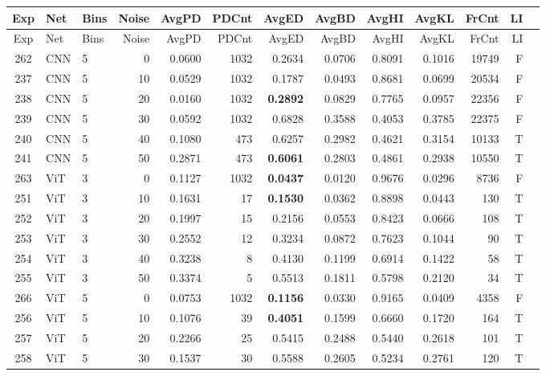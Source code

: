 
\begin{longtable}{@{}cllrrrrrrrrrc@{}}
\toprule
Exp & Net & Bins & Noise & AvgPD & PDCnt & AvgED & AvgBD & AvgHI & AvgKL & FrCnt & LI \\
\midrule
\endfirsthead
\toprule
Exp & Net & Bins & Noise & AvgPD & PDCnt & AvgED & AvgBD & AvgHI & AvgKL & FrCnt & LI \\
\midrule
\endhead
262 & CNN & 5 & 0 & 0.0600 & 1032 & 0.2634 & 0.0706 & 0.8091 & 0.1016 & 19749 & F \\
237 & CNN & 5 & 10 & 0.0529 & 1032 & 0.1787 & 0.0493 & 0.8681 & 0.0699 & 20534 & F \\
238 & CNN & 5 & 20 & 0.0160 & 1032 & \textbf{0.2892} & 0.0829 & 0.7765 & 0.0957 & 22356 & F \\
239 & CNN & 5 & 30 & 0.0592 & 1032 & 0.6828 & 0.3588 & 0.4053 & 0.3785 & 22375 & F \\
240 & CNN & 5 & 40 & 0.1080 & 473 & 0.6257 & 0.2982 & 0.4621 & 0.3154 & 10133 & T \\
241 & CNN & 5 & 50 & 0.2871 & 473 & \textbf{0.6061} & 0.2803 & 0.4861 & 0.2938 & 10550 & T \\
263 & ViT & 3 & 0 & 0.1127 & 1032 & \textbf{0.0437} & 0.0120 & 0.9676 & 0.0296 & 8736 & F \\
251 & ViT & 3 & 10 & 0.1631 & 17 & \textbf{0.1530} & 0.0362 & 0.8898 & 0.0443 & 130 & T \\
252 & ViT & 3 & 20 & 0.1997 & 15 & 0.2156 & 0.0553 & 0.8423 & 0.0666 & 108 & T \\
253 & ViT & 3 & 30 & 0.2552 & 12 & 0.3234 & 0.0872 & 0.7623 & 0.1044 & 90 & T \\
254 & ViT & 3 & 40 & 0.3238 & 8 & 0.4130 & 0.1199 & 0.6914 & 0.1422 & 58 & T \\
255 & ViT & 3 & 50 & 0.3374 & 5 & 0.5513 & 0.1811 & 0.5798 & 0.2120 & 34 & T \\
266 & ViT & 5 & 0 & 0.0753 & 1032 & \textbf{0.1156} & 0.0330 & 0.9165 & 0.0409 & 4358 & F \\
256 & ViT & 5 & 10 & 0.1076 & 39 & \textbf{0.4051} & 0.1599 & 0.6660 & 0.1720 & 164 & T \\
257 & ViT & 5 & 20 & 0.2266 & 25 & 0.5415 & 0.2488 & 0.5440 & 0.2618 & 101 & T \\
258 & ViT & 5 & 30 & 0.1537 & 30 & 0.5588 & 0.2605 & 0.5234 & 0.2761 & 120 & T \\

\end{longtable}
